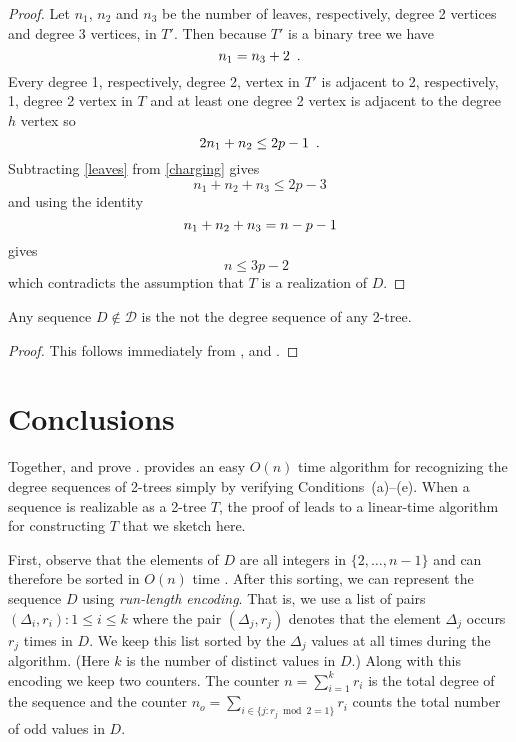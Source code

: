 \documentclass[lotsofwhite,charterfonts]{patmorin}
\begin{document}
\begin{proof}
{{Let $n_1$, $n_2$ and $n_3$ be the number of leaves, respectively, degree 2
vertices and degree 3 vertices, in $T'$.  Then because $T'$ is a
binary tree we have 
\begin{equation}
   n_1=n_3+2 \enspace . \eqlabel{leaves} 
\end{equation}
Every degree 1, respectively, degree 2, vertex in $T'$ is adjacent to
2, respectively, 1, degree 2 vertex in $T$ and at least one degree 2
vertex is adjacent to the degree $h$ vertex so
\begin{equation}
   2n_1 + n_2 \le 2p-1  \enspace . \eqlabel{charging}
\end{equation} 
Subtracting \eqref{leaves} from \eqref{charging} gives
\[
    n_1 + n_2 + n_3 \le 2p-3
\]
and using the identity 
\begin{equation}
     n_1+n_2+n_3 = n-p-1 \eqlabel{size}
\end{equation}
gives
\[
     n \le 3p-2 \enspace 
\]
which contradicts the assumption that $T$ is a realization of $D$.}}
\end{proof}

\begin{lem}
Any sequence $D\not\in \mathcal{D}$ is the not the degree sequence of
any 2-tree.
\end{lem}

\begin{proof}
This follows immediately from ,  and
.
\end{proof}

\section{Conclusions}

Together,  and  prove .
 provides an easy $O(n)$ time algorithm for recognizing
the degree sequences of 2-trees simply by verifying
Conditions~(a)--(e).  When a sequence is realizable as a 2-tree $T$,
the proof of  leads to a linear-time algorithm for
constructing $T$ that we sketch here.

First, observe that the elements of $D$ are all integers in
$\{2,\ldots,n-1\}$ and can therefore be sorted in $O(n)$ time
\cite{clrXX}.  After this sorting, we can represent the sequence $D$
using \emph{run-length encoding}.  That is, we use a list of pairs
$(\Delta_i,r_i):1\le i\le k$ where the pair $(\Delta_j,r_j)$ denotes
that the element $\Delta_j$ occurs $r_j$ times in $D$.  We keep this
list sorted by the $\Delta_j$ values at all times during the
algorithm. (Here $k$ is the number of distinct values in $D$.) Along
with this encoding we keep two counters.  The counter $n=\sum_{i=1}^k
r_i$ is the total degree of the sequence and the counter
$n_o=\sum_{i\in\{j:r_j\bmod 2 =1\}} r_i$ counts the total number
of odd values in $D$.
\end{document}
